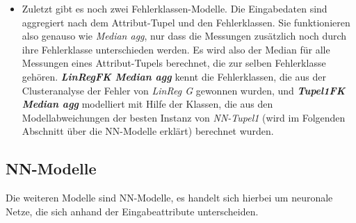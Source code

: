 \documentclass[
	12pt,
	a4paper,
	BCOR10mm,
	DIV14,
	listof=totoc,
	bibliography=totoc,
	headsepline
]{scrreprt}
\begin{document}
\begin{itemize}
	\item Zuletzt gibt es noch zwei Fehlerklassen-Modelle. Die Eingabedaten sind aggregiert nach dem Attribut-Tupel und den Fehlerklassen. 
Sie funktionieren also genauso wie \textit{Median agg}, nur dass die Messungen zusätzlich noch durch ihre Fehlerklasse unterschieden werden. Es wird also der Median für alle Messungen eines Attribut-Tupels berechnet, die zur selben Fehlerklasse gehören.
\textit{\textbf{LinRegFK Median agg}} kennt die Fehlerklassen, die aus der Clusteranalyse der Fehler von \textit{LinReg G} gewonnen wurden, und \textit{\textbf{Tupel1FK Median agg}} modelliert mit Hilfe der Klassen, die aus den Modellabweichungen der besten Instanz von \textit{NN-Tupel1} (wird im Folgenden Abschnitt über die NN-Modelle erklärt) berechnet wurden.
\end{itemize}

\subsection{NN-Modelle}
Die weiteren Modelle sind NN-Modelle, es handelt sich hierbei um neuronale Netze, die sich anhand der Eingabeattribute unterscheiden.
\end{document}
